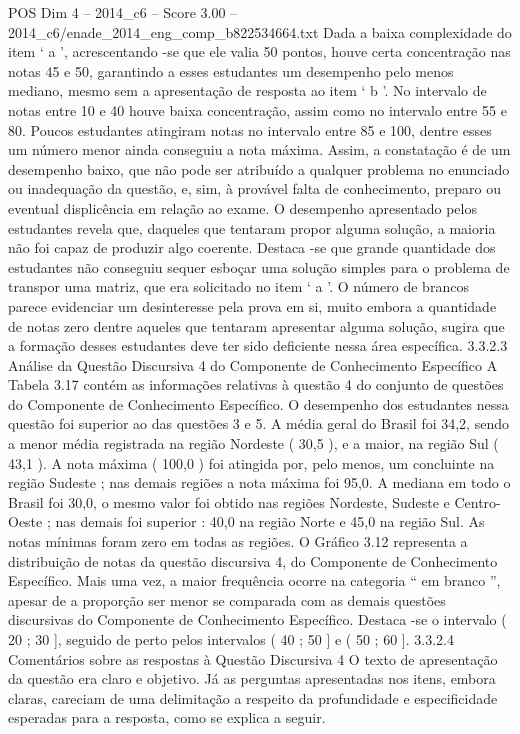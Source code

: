 \begin{textsample}{POS Dim 4 – 2014\_c6 – Score 3.00 – 2014\_c6/enade\_2014\_eng\_comp\_b822534664.txt}
Dada a baixa complexidade do item ‘ a ’, acrescentando -se que ele valia 50 pontos, houve certa concentração nas notas 45 e 50, garantindo a esses estudantes um desempenho pelo menos mediano, mesmo sem a apresentação de resposta ao item ‘ b ’.
No intervalo de notas entre 10 e 40 houve baixa concentração, assim como no intervalo entre 55 e 80.
Poucos estudantes atingiram notas no intervalo entre 85 e 100, dentre esses um número menor ainda conseguiu a nota máxima.
Assim, a constatação é de um desempenho baixo, que não pode ser atribuído a qualquer problema no enunciado ou inadequação da questão, e, sim, à provável falta de conhecimento, preparo ou eventual displicência em relação ao exame.
O desempenho apresentado pelos estudantes revela que, daqueles que tentaram propor alguma solução, a maioria não foi capaz de produzir algo coerente.
Destaca -se que grande quantidade dos estudantes não conseguiu sequer esboçar uma solução simples para o problema de transpor uma matriz, que era solicitado no item ‘ a ’.
O número de brancos parece evidenciar um desinteresse pela prova em si, muito embora a quantidade de notas zero dentre aqueles que tentaram apresentar alguma solução, sugira que a formação desses estudantes deve ter sido deficiente nessa área específica. 3.3.2.3 Análise da Questão Discursiva 4 do Componente de Conhecimento Específico A Tabela 3.17 contém as informações relativas à questão 4 do conjunto de questões do Componente de Conhecimento Específico.
O desempenho dos estudantes nessa questão foi superior ao das questões 3 e 5.
A média geral do Brasil foi 34,2, sendo a menor média registrada na região Nordeste ( 30,5 ), e a maior, na região Sul ( 43,1 ).
A nota máxima ( 100,0 ) foi atingida por, pelo menos, um concluinte na região Sudeste ; nas demais regiões a nota máxima foi 95,0.
A mediana em todo o Brasil foi 30,0, o mesmo valor foi obtido nas regiões Nordeste, Sudeste e Centro-Oeste ; nas demais foi superior : 40,0 na região Norte e 45,0 na região Sul.
As notas mínimas foram zero em todas as regiões.
O Gráfico 3.12 representa a distribuição de notas da questão discursiva 4, do Componente de Conhecimento Específico.
Mais uma vez, a maior frequência ocorre na categoria “ em branco ”, apesar de a proporção ser menor se comparada com as demais questões discursivas do Componente de Conhecimento Específico.
Destaca -se o intervalo ( 20 ; 30 ], seguido de perto pelos intervalos ( 40 ; 50 ] e ( 50 ; 60 ]. 3.3.2.4 Comentários sobre as respostas à Questão Discursiva 4 O texto de apresentação da questão era claro e objetivo.
Já as perguntas apresentadas nos itens, embora claras, careciam de uma delimitação a respeito da profundidade e especificidade esperadas para a resposta, como se explica a seguir.

\end{textsample}
